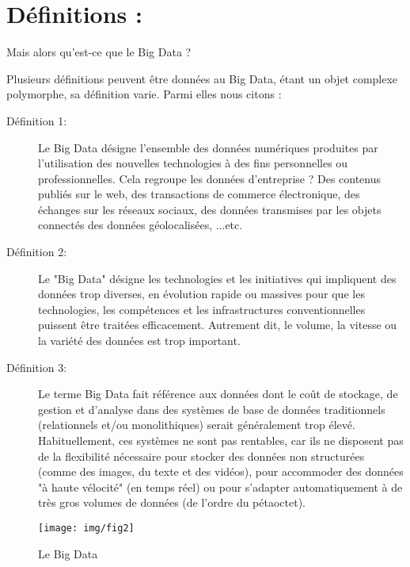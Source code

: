 \section{Définitions : }
\begin{center}
	\color[rgb]{0.2, 0.6, 0.2} Mais alors qu'est-ce que le Big Data ?
\end{center}

Plusieurs définitions peuvent être données au Big Data, étant un objet complexe polymorphe, sa définition varie. Parmi elles nous citons :

\begin{description}
	\item[Définition 1:]Le Big Data désigne l'ensemble des données numériques produites par l'utilisation des nouvelles technologies à des fins personnelles ou professionnelles. Cela regroupe les données d'entreprise ? Des contenus publiés sur le web, des transactions de commerce électronique, des échanges sur les réseaux sociaux, des données transmises par les objets connectés des données géolocalisées, ...etc.
	\item[Définition 2:]Le "Big Data" désigne les technologies et les initiatives qui impliquent des données trop diverses, en évolution rapide ou massives pour que les technologies, les compétences et les infrastructures conventionnelles puissent être traitées efficacement. Autrement dit, le volume, la vitesse ou la variété des données est trop important.
	\item[Définition 3:]Le terme Big Data fait référence aux données dont le coût de stockage, de gestion et d'analyse dans des systèmes de base de données traditionnels (relationnels et/ou monolithiques) serait généralement trop élevé. Habituellement, ces systèmes ne sont pas rentables, car ils ne disposent pas de la flexibilité nécessaire pour stocker des données non structurées (comme des images, du texte et des vidéos), pour accommoder des données "à haute vélocité" (en temps réel) ou pour s'adapter automatiquement à de très gros volumes de données (de l'ordre du pétaoctet).
\end{description}

\begin{figure}[h]
	\centering
	\texttt{[image: img/fig2]}
	\caption{Le Big Data}
\end{figure}